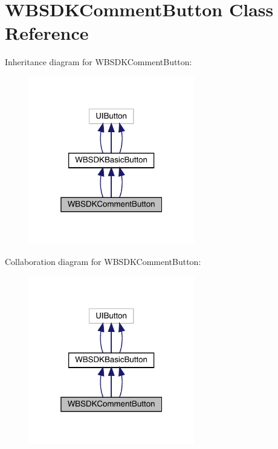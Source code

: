 \hypertarget{interface_w_b_s_d_k_comment_button}{}\section{W\+B\+S\+D\+K\+Comment\+Button Class Reference}
\label{interface_w_b_s_d_k_comment_button}


Inheritance diagram for W\+B\+S\+D\+K\+Comment\+Button\+:\nopagebreak
\begin{figure}[H]
\begin{center}
\leavevmode
\includegraphics[width=205pt]{interface_w_b_s_d_k_comment_button__inherit__graph}
\end{center}
\end{figure}


Collaboration diagram for W\+B\+S\+D\+K\+Comment\+Button\+:\nopagebreak
\begin{figure}[H]
\begin{center}
\leavevmode
\includegraphics[width=205pt]{interface_w_b_s_d_k_comment_button__coll__graph}
\end{center}
\end{figure}
